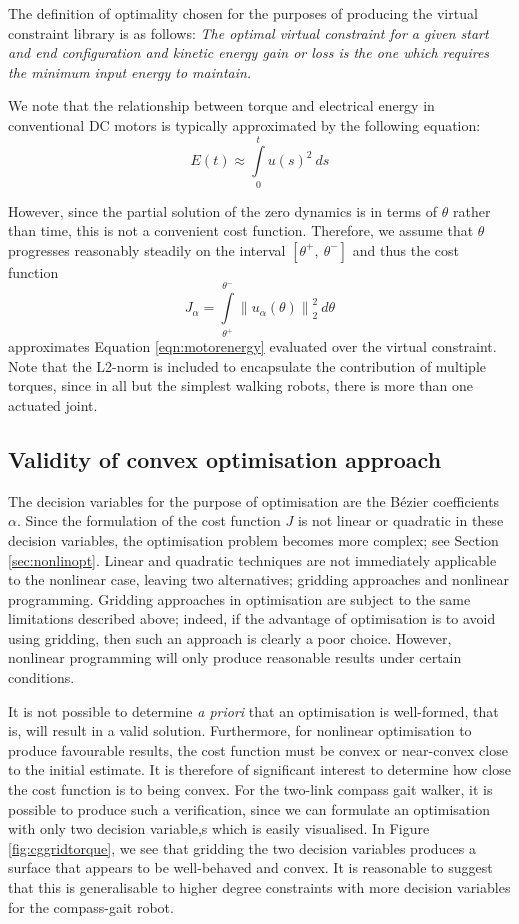 The definition of optimality chosen for the purposes of producing the virtual constraint library is as follows:
\emph{The optimal virtual constraint for a given start and end configuration and kinetic energy gain or loss is the one which requires the minimum input energy to maintain.}

We note that the relationship between torque and electrical energy in conventional DC motors is typically approximated by the following equation:
\begin{equation} \label{eqn:motorenergy}
	E(t) \approx \int\limits_0^t u(s)^2 ~ ds
\end{equation}

However, since the partial solution of the zero dynamics is in terms of $\theta$ rather than time, this is not a convenient cost function. Therefore, we assume that $\theta$ progresses reasonably steadily on the interval $[\theta^+,~\theta^-]$ and thus the cost function
\begin{equation}
	J_\alpha = \int\limits_{\theta^+}^{\theta^-} \left\lVert u_\alpha(\theta) \right\rVert_2^2 ~ d\theta
\end{equation}
approximates Equation \ref{eqn:motorenergy} evaluated over the virtual constraint. Note that the L2-norm is included to encapsulate the contribution of multiple torques, since in all but the simplest walking robots, there is more than one actuated joint.

\subsection{Validity of convex optimisation approach}
The decision variables for the purpose of optimisation are the Bézier coefficients $\alpha$. Since the formulation of the cost function $J$ is not linear or quadratic in these decision variables, the optimisation problem becomes more complex; see Section \ref{sec:nonlinopt}. Linear and quadratic techniques are not immediately applicable to the nonlinear case, leaving two alternatives; gridding approaches and nonlinear programming. Gridding approaches in optimisation are subject to the same limitations described above; indeed, if the advantage of optimisation is to avoid using gridding, then such an approach is clearly a poor choice. However, nonlinear programming will only produce reasonable results under certain conditions.

It is not possible to determine \textit{a priori} that an optimisation is well-formed, that is, will result in a valid solution. Furthermore, for nonlinear optimisation to produce favourable results, the cost function must be convex or near-convex close to the initial estimate. It is therefore of significant interest to determine how close the cost function is to being convex. For the two-link compass gait walker, it is possible to produce such a verification, since we can formulate an optimisation with only two decision variable,s which is easily visualised. In Figure \ref{fig:cggridtorque}, we see that gridding the two decision variables produces a surface that appears to be well-behaved and convex. It is reasonable to suggest that this is generalisable to higher degree constraints with more decision variables for the compass-gait robot.

